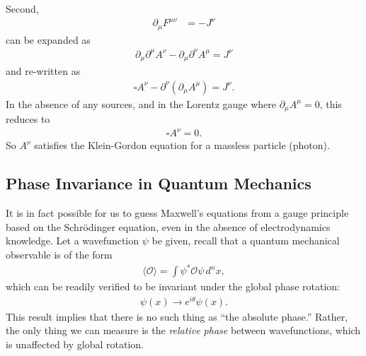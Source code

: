 \documentclass[a4paper,11pt]{article}
\numberwithin{equation}{section}
\theoremstyle{definition}
\newcommand{\p}{\partial}
\begin{document}
Second, 
\begin{align}
\p_\mu F^{\mu\nu} &= -J^\nu
\end{align}
can be expanded as
\begin{align}
\p_\mu \p^\mu A^\nu - \p_\mu \p^\nu A^\mu = J^\nu
\end{align}
and re-written as
\begin{align}
\square A^\nu - \p^\nu(\p_\mu A^\mu) = J^\nu.
\end{align}
In the absence of any sources, and in the Lorentz gauge where $\p_\mu A^\mu = 0$, this reduces to
\begin{align}
\square A^\nu = 0.
\end{align}
So $A^\nu$ satisfies the Klein-Gordon equation for a massless particle (photon). 


\subsection{Phase Invariance in Quantum Mechanics}
It is in fact possible for us to guess Maxwell's equations from a gauge principle based on the Schr\"odinger equation, even in the absence of electrodynamics knowledge. Let a wavefunction $\psi$ be given, recall that a quantum mechanical observable is of the form
\begin{align}
\langle \mathcal{O} \rangle = \int\psi^* \mathcal{O} \psi\, d^nx,
\end{align}
which can be readily verified to be invariant under the global phase rotation:
\begin{align}
\psi(x) \to e^{i\theta}\psi(x).
\end{align}
This result implies that there is no such thing as ``the absolute phase.'' Rather, the only thing we can measure is the \textit{relative phase} between wavefunctions, which is unaffected by global rotation.\\
\end{document}
